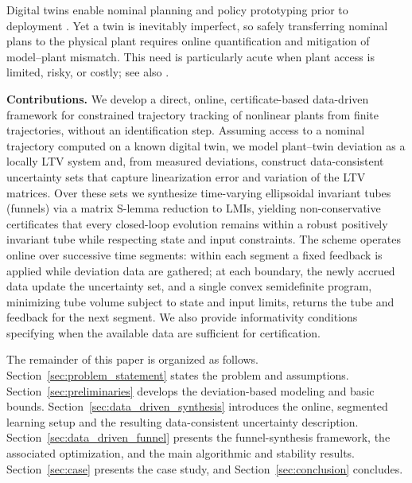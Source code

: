 \documentclass[letterpaper, 10 pt, conference]{ieeeconf}
\begin{document}
Digital twins enable nominal planning and policy prototyping prior to deployment \cite{Asch2022-iw,Zhang2024-wc}. Yet a twin is inevitably imperfect, so safely transferring nominal plans to the physical plant requires online quantification and mitigation of model–plant mismatch. This need is particularly acute when plant access is limited, risky, or costly; see also \cite{Wickramasinghe2025-us}.

\textbf{Contributions.} We develop a direct, online, certificate-based data-driven framework for constrained trajectory tracking of nonlinear plants from finite trajectories, without an identification step. Assuming access to a nominal trajectory computed on a known digital twin, we model plant–twin deviation as a locally LTV system and, from measured deviations, construct data-consistent uncertainty sets that capture linearization error and variation of the LTV matrices. Over these sets we synthesize time-varying ellipsoidal invariant tubes (funnels) via a matrix S-lemma reduction to LMIs, yielding non-conservative certificates that every closed-loop evolution remains within a robust positively invariant tube while respecting state and input constraints. The scheme operates online over successive time segments: within each segment a fixed feedback is applied while deviation data are gathered; at each boundary, the newly accrued data update the uncertainty set, and a single convex semidefinite program, minimizing tube volume subject to state and input limits, returns the tube and feedback for the next segment. We also provide informativity conditions specifying when the available data are sufficient for certification.

The remainder of this paper is organized as follows.
Section~\ref{sec:problem_statement} states the problem and assumptions.
Section~\ref{sec:preliminaries} develops the deviation-based modeling and basic bounds.
Section~\ref{sec:data_driven_synthesis} introduces the online, segmented learning setup and the resulting data-consistent uncertainty description.
Section~\ref{sec:data_driven_funnel} presents the funnel-synthesis framework, the associated optimization, and the main algorithmic and stability results.
Section~\ref{sec:case} presents the case study, and Section~\ref{sec:conclusion} concludes.
\end{document}
